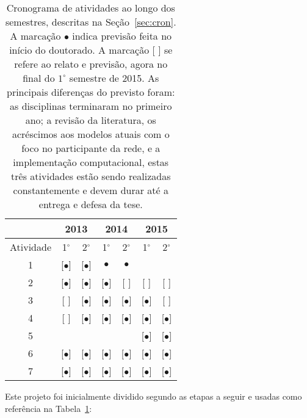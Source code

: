 \documentclass[a4paper,openright,12pt]{report} %
\begin{document}
\begin{table}[h]
\begin{center}
  \caption{Cronograma de atividades ao longo dos semestres, descritas na Seção~\ref{sec:cron}.
      A marcação $\bullet$ indica previsão feita no início do doutorado.
  A marcação [ ] se refere ao relato e previsão, agora no final do $1^{\circ}$ semestre de 2015.
  As principais diferenças do previsto foram: as disciplinas terminaram no primeiro ano; a revisão da literatura, os acréscimos aos modelos atuais com o foco no participante da rede, e a implementação computacional, estas três atividades estão sendo realizadas constantemente e devem durar até a entrega e defesa da tese. }
\label{tab:cron}
  \begin{tabular}{ | c ||   c | c |     c | c |   c | c |}
    \hline
      & \multicolumn{2}{|c|}{2013} & \multicolumn{2}{|c|}{2014} & \multicolumn{2}{|c|}{2015} \\
    \hline
    Atividade & 1$^{\circ}$ & 2$^{\circ}$ & 1$^{\circ}$ & 2$^{\circ}$ & 1$^{\circ}$ & 2$^{\circ}$ \\
    \hline \hline

    1 & [$\bullet$] & [$\bullet$] & $\bullet$ & $\bullet$ & & \\
    \hline
    2 & [$\bullet$] & [$\bullet$] & [$\bullet$] & [ ] & [ ] & [ ] \\
    \hline
    3 & [ ] & [$\bullet$] & [$\bullet$] & [$\bullet$] & [$\bullet$] & [ ]  \\
    \hline
    4 & [ ] & [$\bullet$] & [$\bullet$] & [$\bullet$] & [$\bullet$] & [$\bullet$]  \\
    \hline
    5 & & & & & [$\bullet$] & [$\bullet$]  \\
    \hline
    6 & [$\bullet$] & [$\bullet$] & [$\bullet$] & [$\bullet$] & [$\bullet$] & [$\bullet$]  \\
    \hline
    7 & [$\bullet$] & [$\bullet$] & [$\bullet$] & [$\bullet$] & [$\bullet$] & [$\bullet$]  \\
    \hline
  \end{tabular}
\end{center}
\end{table}


Este projeto foi inicialmente dividido segundo as etapas a seguir 
e usadas como referência na Tabela~\ref{tab:cron}:
\end{document}
